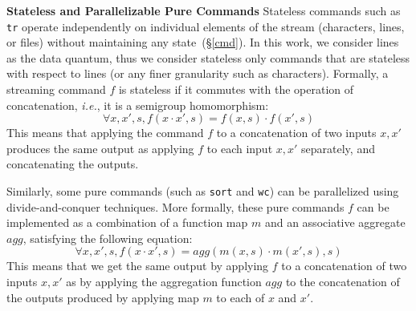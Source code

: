 \documentclass[sigplan, review, screen, anonymous]{acmart}
\newcommand{\ie}{{\em i.e.}, }
\newcommand{\heading}[1]{\vspace{4pt}\noindent\textbf{#1}\enspace}
\newcommand{\ttt}[1]{\texttt{#1}}
\newcommand{\kk}[1]{[{\color{magenta}kk: #1}]}
\newcommand{\km}[1]{[{\color{blue}km: #1}]}
\newcommand{\sx}[1]{(\S\ref{#1})}
\begin{document}

\heading{Stateless and Parallelizable Pure Commands}
Stateless commands such as \ttt{tr}
operate independently on individual elements of the stream
(characters, lines, or files) without maintaining any state~\sx{cmd}. In this
work, we consider lines as the data quantum, thus we consider stateless only commands that are
stateless with respect to lines (or any finer granularity such as
characters). Formally, a streaming command $f$ is stateless if it commutes with
the operation of concatenation, \ie it is a semigroup homomorphism:
%
\[
\forall x, x', s, f(x \cdot x', s) = f(x, s) \cdot f(x', s)
\]
%
%
\noindent
This means that applying the command $f$ to a concatenation of two
inputs $x, x'$ produces the same output as applying $f$ to each input
$x, x'$ separately, and concatenating the outputs.

Similarly, some pure commands (such as \ttt{sort} and \ttt{wc}) can be
parallelized using divide-and-conquer techniques. More formally, these
pure commands $f$ can be implemented as a combination of a function map
$m$ and an associative aggregate $agg$, satisfying the following equation:
%
\[
\forall x, x', s, f(x \cdot x', s) = agg(m(x, s) \cdot m(x', s), s)
\]
%
\noindent
This means that we get the same output by applying $f$ to a
concatenation of two inputs $x, x'$ as by applying the aggregation function
$agg$ to the concatenation of the outputs produced by applying map $m$
to each of $x$ and $x'$.
\end{document}
